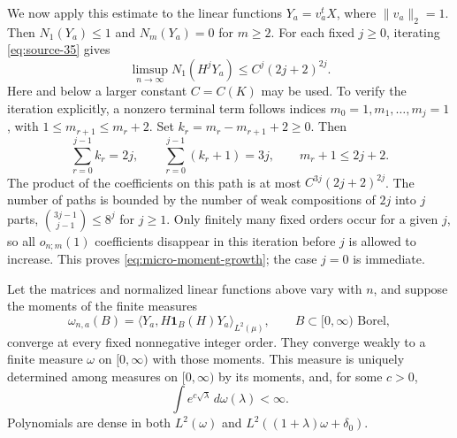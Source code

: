 We now apply this estimate to the linear functions $Y_a=v_a^tX$,
where $\|v_a\|_2=1$.  Then $N_1(Y_a)\le1$ and $N_m(Y_a)=0$ for $m\ge2$.
For each fixed $j\ge0$, iterating \eqref{eq:source-35} gives
\begin{equation}
 \limsup_{n\to\infty}N_1(H^jY_a)
                  \le C^j(2j+2)^{2j}.
 \label{eq:micro-moment-growth}
\end{equation}
Here and below a larger constant $C=C(K)$ may be used.  To verify the
iteration explicitly, a nonzero terminal term follows indices
$m_0=1,m_1,\ldots,m_j=1$, with $1\le m_{r+1}\le m_r+2$.
Set $k_r=m_r-m_{r+1}+2\ge0$.  Then
\[
 \sum_{r=0}^{j-1}k_r=2j,\qquad
 \sum_{r=0}^{j-1}(k_r+1)=3j,\qquad m_r+1\le2j+2.
\]
The product of the coefficients on this path is at most
$C^{3j}(2j+2)^{2j}$.  The number of paths is bounded by the number of
weak compositions of $2j$ into $j$ parts,
$\binom{3j-1}{j-1}\le8^j$ for $j\ge1$.  Only finitely many fixed orders
occur for a given $j$, so all $o_{n;m}(1)$ coefficients disappear in this
iteration before $j$ is allowed to increase.  This proves
\eqref{eq:micro-moment-growth}; the case $j=0$ is immediate.

\begin{corollary}
\label{cor:micro-moment-density}
Let the matrices and normalized linear functions above vary with $n$,
and suppose the moments of the finite measures
\[
 \omega_{n,a}(B)=\langle Y_a,H\mathbf1_B(H)Y_a\rangle_{L^2(\mu)},
 \qquad B\subset[0,\infty)\text{ Borel},
\]
converge at every fixed nonnegative integer order.  They converge weakly
to a finite measure $\omega$ on $[0,\infty)$ with those moments.
This measure is uniquely determined among measures on $[0,\infty)$ by
its moments, and, for some $c>0$,
\[
 \int e^{c\sqrt\lambda}\,d\omega(\lambda)<\infty.
\]
Polynomials are dense in both $L^2(\omega)$ and
$L^2((1+\lambda)\omega+\delta_0)$.
\end{corollary}

